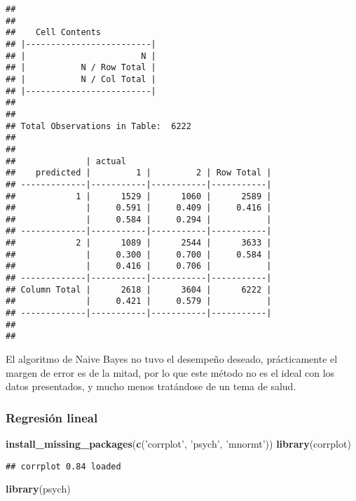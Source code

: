 \documentclass[]{article}
\newenvironment{Shaded}{\begin{snugshade}}{\end{snugshade}}
\newcommand{\KeywordTok}[1]{\textcolor[rgb]{0.13,0.29,0.53}{\textbf{#1}}}
\newcommand{\NormalTok}[1]{#1}
\newcommand{\StringTok}[1]{\textcolor[rgb]{0.31,0.60,0.02}{#1}}
\begin{document}
\begin{verbatim}
## 
##  
##    Cell Contents
## |-------------------------|
## |                       N |
## |           N / Row Total |
## |           N / Col Total |
## |-------------------------|
## 
##  
## Total Observations in Table:  6222 
## 
##  
##              | actual 
##    predicted |         1 |         2 | Row Total | 
## -------------|-----------|-----------|-----------|
##            1 |      1529 |      1060 |      2589 | 
##              |     0.591 |     0.409 |     0.416 | 
##              |     0.584 |     0.294 |           | 
## -------------|-----------|-----------|-----------|
##            2 |      1089 |      2544 |      3633 | 
##              |     0.300 |     0.700 |     0.584 | 
##              |     0.416 |     0.706 |           | 
## -------------|-----------|-----------|-----------|
## Column Total |      2618 |      3604 |      6222 | 
##              |     0.421 |     0.579 |           | 
## -------------|-----------|-----------|-----------|
## 
## 
\end{verbatim}

El algoritmo de Naive Bayes no tuvo el desempeño deseado, prácticamente
el margen de error es de la mitad, por lo que este método no es el ideal
con los datos presentados, y mucho menos tratándose de un tema de salud.

\hypertarget{regresiuxf3n-lineal-1}{%
\subsubsection{Regresión lineal}\label{regresiuxf3n-lineal-1}}

\begin{Shaded}
\begin{Highlighting}[]
\KeywordTok{install_missing_packages}\NormalTok{(}\KeywordTok{c}\NormalTok{(}\StringTok{'corrplot'}\NormalTok{, }\StringTok{'psych'}\NormalTok{, }\StringTok{'mnormt'}\NormalTok{))}
\KeywordTok{library}\NormalTok{(corrplot)}
\end{Highlighting}
\end{Shaded}

\begin{verbatim}
## corrplot 0.84 loaded
\end{verbatim}

\begin{Shaded}
\begin{Highlighting}[]
\KeywordTok{library}\NormalTok{(psych)}
\end{Highlighting}
\end{Shaded}
\end{document}
